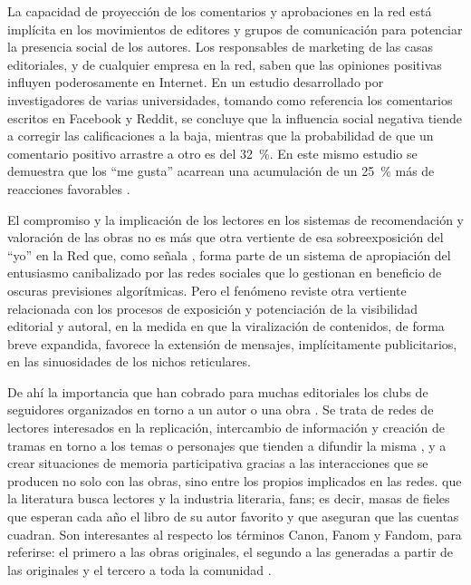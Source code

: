 \documentclass[spanish]{textolivre}
\begin{document}
La capacidad de proyección de los comentarios y aprobaciones en la red está implícita en los movimientos de editores y grupos de comunicación para potenciar la presencia social de los autores. Los responsables de marketing de las casas editoriales, y de cualquier empresa en la red, saben que las opiniones positivas influyen poderosamente en Internet. En un estudio desarrollado por investigadores de varias universidades, tomando como referencia los comentarios escritos en Facebook y Reddit, se concluye que la influencia social negativa tiende a corregir las calificaciones a la baja, mientras que la probabilidad de que un comentario positivo arrastre a otro es del 32~\%. En este mismo estudio se demuestra que los “me gusta” acarrean una acumulación de un 25~\% más de reacciones favorables \cite{cordon-garcia_evolution_2019}. 

El compromiso y la implicación de los lectores en los sistemas de recomendación y valoración de las obras no es más que otra vertiente de esa sobreexposición del “yo” en la Red que, como señala \textcite{zafra_entusiasmo:_2017}, forma parte de un sistema de apropiación del entusiasmo canibalizado por las redes sociales que lo gestionan en beneficio de oscuras previsiones algorítmicas. Pero el fenómeno reviste otra vertiente relacionada con los procesos de exposición y potenciación de la visibilidad editorial y autoral, en la medida en que la viralización de contenidos, de forma breve expandida, favorece la extensión de mensajes, implícitamente publicitarios, en las sinuosidades de los nichos reticulares.

De ahí la importancia que han cobrado para muchas editoriales los clubs de seguidores organizados en torno a un autor o una obra \cite{cruz_martin_fenomeno_2016}. Se trata de redes de lectores interesados en la replicación, intercambio de información y creación de tramas en torno a los temas o personajes que tienden a difundir la misma \cite{coppa_fanfiction_2017}, y a crear situaciones de memoria participativa \cite{potts_participatory_2018} gracias a las interacciones que se producen no solo con las obras, sino entre los propios implicados en las redes. \textcite{rodriguez_marcos_21_2019} que la literatura busca lectores y la industria literaria, fans; es decir, masas de fieles que esperan cada año el libro de su autor favorito y que aseguran que las cuentas cuadran. Son interesantes al respecto los términos Canon, Fanom y Fandom, para referirse: el primero a las obras originales, el segundo a las generadas a partir de las originales y el tercero a toda la comunidad \cite{scolari_narrativas_2013,chartier_cultura_2019}.
\end{document}
